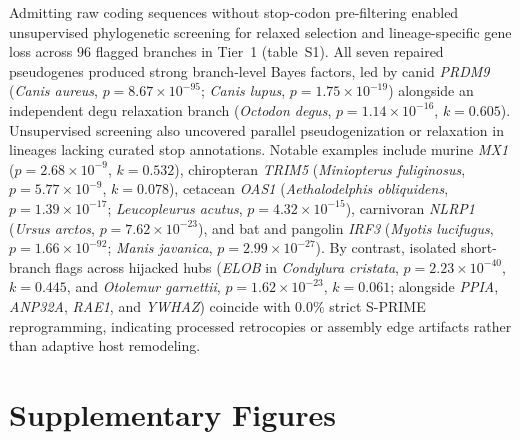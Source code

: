 \documentclass[12pt]{article}
\begin{document}
Admitting raw coding sequences without stop-codon pre-filtering enabled unsupervised phylogenetic screening for relaxed selection and lineage-specific gene loss across $96$ flagged branches in Tier~1 (table~S1). All seven repaired pseudogenes produced strong branch-level Bayes factors, led by canid \textit{PRDM9} (\textit{Canis aureus}, $p = 8.67 \times 10^{-95}$; \textit{Canis lupus}, $p = 1.75 \times 10^{-19}$) alongside an independent degu relaxation branch (\textit{Octodon degus}, $p = 1.14 \times 10^{-16}$, $k = 0.605$). Unsupervised screening also uncovered parallel pseudogenization or relaxation in lineages lacking curated stop annotations. Notable examples include murine \textit{MX1} ($p = 2.68 \times 10^{-9}$, $k = 0.532$), chiropteran \textit{TRIM5} (\textit{Miniopterus fuliginosus}, $p = 5.77 \times 10^{-9}$, $k = 0.078$), cetacean \textit{OAS1} (\textit{Aethalodelphis obliquidens}, $p = 1.39 \times 10^{-17}$; \textit{Leucopleurus acutus}, $p = 4.32 \times 10^{-15}$), carnivoran \textit{NLRP1} (\textit{Ursus arctos}, $p = 7.62 \times 10^{-23}$), and bat and pangolin \textit{IRF3} (\textit{Myotis lucifugus}, $p = 1.66 \times 10^{-92}$; \textit{Manis javanica}, $p = 2.99 \times 10^{-27}$). By contrast, isolated short-branch flags across hijacked hubs (\textit{ELOB} in \textit{Condylura cristata}, $p = 2.23 \times 10^{-40}$, $k = 0.445$, and \textit{Otolemur garnettii}, $p = 1.62 \times 10^{-23}$, $k = 0.061$; alongside \textit{PPIA}, \textit{ANP32A}, \textit{RAE1}, and \textit{YWHAZ}) coincide with $0.0\%$ strict S-PRIME reprogramming, indicating processed retrocopies or assembly edge artifacts rather than adaptive host remodeling.

\clearpage

\section*{Supplementary Figures}
\end{document}
